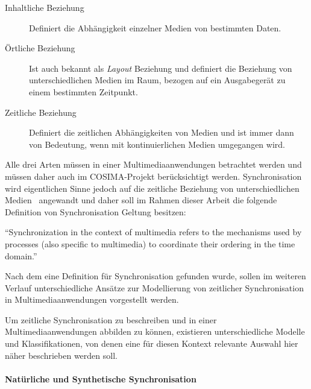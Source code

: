   \begin{description}
    \item[Inhaltliche Beziehung] Definiert die Abhängigkeit einzelner Medien von bestimmten Daten.
    \item[Örtliche Beziehung] Ist auch bekannt als \emph{Layout} Beziehung und definiert die Beziehung von unterschiedlichen Medien im Raum, bezogen auf ein Ausgabegerät zu einem bestimmten Zeitpunkt.
    \item[Zeitliche Beziehung] Definiert die zeitlichen Abhängigkeiten von Medien und ist immer dann von Bedeutung, wenn mit kontinuierlichen Medien umgegangen wird.
  \end{description}
  
  Alle drei Arten müssen in einer Multimediaanwendungen betrachtet werden und müssen daher auch im COSIMA-Projekt berücksichtigt werden. Synchronisation wird eigentlichen Sinne jedoch auf die zeitliche Beziehung von unterschiedlichen Medien~\citep[S. 572]{steinmetz1995mcc} angewandt und daher soll im Rahmen dieser Arbeit die folgende Definition von Synchronisation Geltung besitzen: 
  
  \begin{definition}[Synchronisation]\label{def:synchronisation}
    "`Synchronization in the context of multimedia refers to the mechanisms used by processes (also specific to multimedia) to coordinate their ordering in the time domain."'~\emph{\citep[S. 401]{steinmetz1990spm}}
  \end{definition}
  
  Nach dem eine Definition für Synchronisation gefunden wurde, sollen im weiteren Verlauf unterschiedliche Ansätze zur Modellierung von zeitlicher Synchronisation in Multimediaanwendungen vorgestellt werden.
  
\label{msec:modelle_zur_beschreibung_zeitlicher_synchronisation}

  Um zeitliche Synchronisation zu beschreiben und in einer Multimediaanwendungen abbilden zu können, existieren unterschiedliche Modelle und Klassifikationen, von denen eine für diesen Kontext relevante Auswahl hier näher beschrieben werden soll.
  
\paragraph{Natürliche und Synthetische Synchronisation} %
\label{par:natuerliche_und_synthetische_synchronisation}

